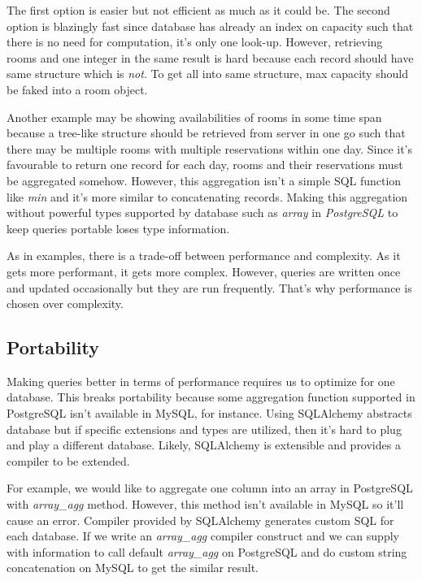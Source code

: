 The first option is easier but not efficient as much as it could be. The second option is blazingly fast since database has already an index on capacity such that there is no need for computation, it's only one look-up. However, retrieving rooms and one integer in the same result is hard because each record should have same structure which is \textit{not}. To get all into same structure, max capacity should be faked into a room object. 

Another example may be showing availabilities of rooms in some time span because a tree-like structure should be retrieved from server in one go such that there may be multiple rooms with multiple reservations within one day. Since it's favourable to return one record for each day, rooms and their reservations must be aggregated somehow. However, this aggregation isn't a simple SQL function like \textit{min} and it's more similar to concatenating records. Making this aggregation without powerful types supported by database such as \textit{array} in \textit{PostgreSQL} to keep queries portable loses type information.

As in examples, there is a trade-off between performance and complexity. As it gets more performant, it gets more complex. However, queries are written once and updated occasionally but they are run frequently. That's why performance is chosen over complexity.

\subsection{Portability}

Making queries better in terms of performance requires us to optimize for one database. This breaks portability because some aggregation function supported in PostgreSQL isn't available in MySQL, for instance. Using SQLAlchemy abstracts database but if specific extensions and types are utilized, then it's hard to plug and play a different database. Likely, SQLAlchemy is extensible and provides a compiler to be extended.

For example, we would like to aggregate one column into an array in PostgreSQL with \textit{array\_agg} method. However, this method isn't available in MySQL so it'll cause an error. Compiler provided by SQLAlchemy generates custom SQL for each database. If we write an \textit{array\_agg} compiler construct and we can supply with information to call default \textit{array\_agg} on PostgreSQL and do custom string concatenation on MySQL to get the similar result.

